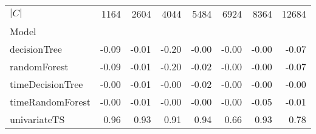 \begin{tabular}{lrrrrrrr}
\toprule
$|C|$ & 1164 & 2604 & 4044 & 5484 & 6924 & 8364 & 12684 \\
Model &  &  &  &  &  &  &  \\
\midrule
decisionTree & -0.09 & -0.01 & -0.20 & -0.00 & -0.00 & -0.00 & -0.07 \\
randomForest & -0.09 & -0.01 & -0.20 & -0.02 & -0.00 & -0.00 & -0.07 \\
timeDecisionTree & -0.00 & -0.01 & -0.00 & -0.02 & -0.00 & -0.00 & -0.00 \\
timeRandomForest & -0.00 & -0.01 & -0.00 & -0.00 & -0.00 & -0.05 & -0.01 \\
univariateTS & 0.96 & 0.93 & 0.91 & 0.94 & 0.66 & 0.93 & 0.78 \\
\bottomrule
\end{tabular}
